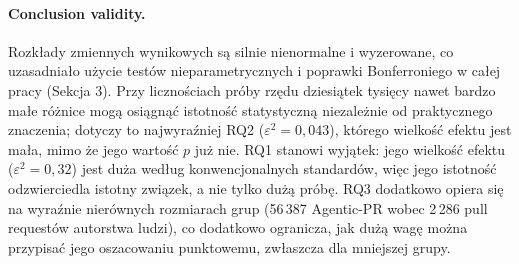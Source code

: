 \paragraph{Conclusion validity.}
Rozkłady zmiennych wynikowych są silnie nienormalne i wyzerowane, co uzasadniało użycie testów nieparametrycznych i poprawki Bonferroniego w całej pracy (Sekcja 3). Przy licznościach próby rzędu dziesiątek tysięcy nawet bardzo małe różnice mogą osiągnąć istotność statystyczną niezależnie od praktycznego znaczenia; dotyczy to najwyraźniej RQ2 ($\varepsilon^2=0,043$), którego wielkość efektu jest mała, mimo że jego wartość $p$ już nie. RQ1 stanowi wyjątek: jego wielkość efektu ($\varepsilon^2=0,32$) jest duża według konwencjonalnych standardów, więc jego istotność odzwierciedla istotny związek, a nie tylko dużą próbę. RQ3 dodatkowo opiera się na wyraźnie nierównych rozmiarach grup (56\,387 Agentic-PR wobec 2\,286 pull requestów autorstwa ludzi), co dodatkowo ogranicza, jak dużą wagę można przypisać jego oszacowaniu punktowemu, zwłaszcza dla mniejszej grupy.
